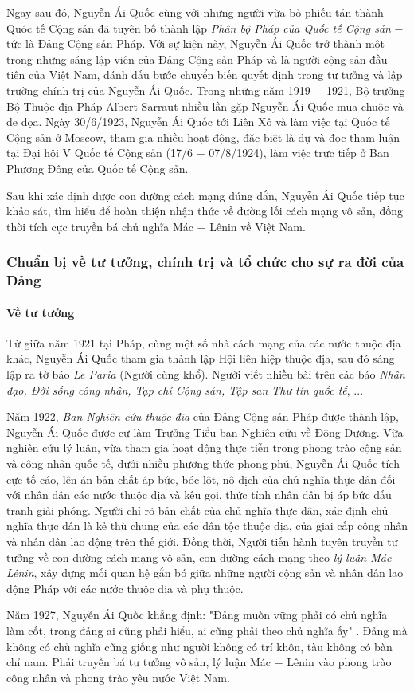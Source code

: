 Ngay sau đó, Nguyễn Ái Quốc cùng với những người vừa bỏ phiếu tán thành Quóc tế Cộng sản đã tuyên bố thành lập \textit{Phân bộ Pháp của Quốc tế Cộng sản} $-$ tức là Đảng Cộng sản Pháp. Với sự kiện này, Nguyễn Ái Quốc trở thành một trong những sáng lập viên của Đảng Cộng sản Pháp và là người cộng sản đầu tiên của Việt Nam, đánh dấu bước chuyển biến quyết định trong tư tưởng và lập trường chính trị của Nguyễn Ái Quốc. Trong những năm 1919 $-$ 1921, Bộ trưởng Bộ Thuộc địa Pháp Albert Sarraut nhiều lần gặp Nguyễn Ái Quốc mua chuộc và đe dọa. Ngày 30/6/1923, Nguyễn Ái Quốc tới Liên Xô và làm việc tại Quốc tế Cộng sản ở Moscow, tham gia nhiều hoạt động, đặc biệt là dự và đọc tham luận tại Đại hội V Quốc tế Cộng sản (17/6 $-$ 07/8/1924), làm việc trực tiếp ở Ban Phương Đông của Quốc tế Cộng sản.

Sau khi xác định được con đường cách mạng đúng đắn, Nguyễn Ái Quốc tiếp tục khảo sát, tìm hiểu để hoàn thiện nhận thức về đường lối cách mạng vô sản, đồng thời tích cực truyền bá chủ nghĩa Mác $-$ Lênin về Việt Nam.

\subsubsection{Chuẩn bị về tư tưởng, chính trị và tổ chức cho sự ra đời của Đảng}
\paragraph{Về tư tưởng}
Từ giữa năm 1921 tại Pháp, cùng một số nhà cách mạng của các nước thuộc địa khác, Nguyễn Ái Quốc tham gia thành lập Hội liên hiệp thuộc địa, sau đó sáng lập ra tờ báo \textit{Le Paria} (Người cùng khổ). Người viết nhiều bài trên các báo \textit{Nhân đạo, Đời sống công nhân, Tạp chí Cộng sản, Tập san Thư tín quốc tế}, ...

Năm 1922, \textit{Ban Nghiên cứu thuộc địa} của Đảng Cộng sản Pháp được thành lập, Nguyễn Ái Quốc được cư làm Trưởng Tiểu ban Nghiên cứu về Đông Dương. Vừa nghiên cứu lý luận, vừa tham gia hoạt động thực tiễn trong phong trào cộng sản và công nhân quốc tế, dưới nhiều phương thức phong phú, Nguyễn Ái Quốc tích cực tố cáo, lên án bản chất áp bức, bóc lột, nô dịch của chủ nghĩa thực dân đối với nhân dân các nước thuộc địa và kêu gọi, thức tỉnh nhân dân bị áp bức đấu tranh giải phóng. Người chỉ rõ bản chất của chủ nghĩa thực dân, xác định chủ nghĩa thực dân là kẻ thù chung của các dân tộc thuộc địa, của giai cấp công nhân và nhân dân lao động trên thế giới. Đồng thời, Người tiến hành tuyên truyền tư tưởng về con đường cách mạng vô sản, con đường cách mạng theo \textit{lý luận Mác $-$ Lênin}, xây dựng mối quan hệ gắn bó giữa những người cộng sản và nhân dân lao động Pháp với các nước thuộc địa và phụ thuộc.

Năm 1927, Nguyễn Ái Quốc khẳng định: "Đảng muốn vững phải có chủ nghĩa làm cốt, trong đảng ai cũng phải hiểu, ai cũng phải theo chủ nghĩa ấy" . Đảng mà không có chủ nghĩa cũng giống như người không có trí khôn, tàu không có bàn chỉ nam. Phải truyền bá tư tưởng vô sản, lý luận Mác $-$ Lênin vào phong trào công nhân và phong trào yêu nước Việt Nam.